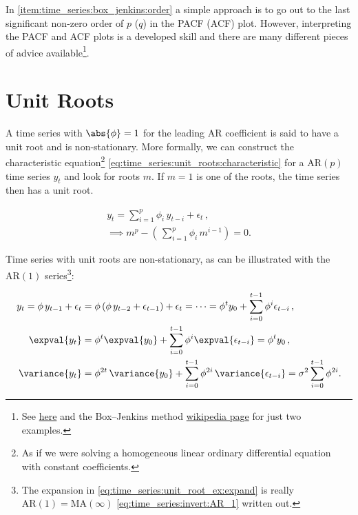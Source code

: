 In \cref{item:time_series:box_jenkins:order} a simple approach is to
go out to the last significant non-zero order of $p$ ($q$) in the PACF (ACF) plot.
However, interpreting the PACF and ACF plots is a developed skill
and there are many different pieces of advice
available\footnote{See
\href{https://people.duke.edu/~rnau/411arim3.htm}{here}
and the Box--Jenkins method
\href{https://en.wikipedia.org/wiki/Box\%E2\%80\%93Jenkins\_method\#Autocorrelation\_and\_partial\_autocorrelation\_plots}{wikipedia page}
for just two examples.}.

\section{Unit Roots}
\label{time_series:unit_root}

A time series with $\abs{\phi} = 1$ for the leading AR coefficient
is said to have a unit root and is non-stationary.
More formally, we can construct the characteristic
equation\footnote{As if we were solving a
homogeneous linear ordinary differential equation with constant coefficients.} \cref{eq:time_series:unit_roots:characteristic}
for a $\text{AR}\left(p\right)$ time series $y_{t}$ and look for roots $m$.
If $m=1$ is one of the roots, the time series then has a unit root.

\begin{subequations}\label{eq:time_series:unit_roots}
\begin{gather}
y_{t} = \sum_{i=1}^{p} \phi_{i}\, y_{t-i} + \epsilon_{t}\,, \label{eq:time_series:unit_roots:y} \\
\implies m^{p} - \left(\, \sum_{i=1}^{p} \phi_{i}\, m^{i-1} \right) = 0. \label{eq:time_series:unit_roots:characteristic}
\end{gather}
\end{subequations}

Time series with unit roots are non-stationary,
as can be illustrated with the $\text{AR}\left(1\right)$ series\footnote{The expansion
in \cref{eq:time_series:unit_root_ex:expand} is really
$\text{AR}\left(1\right) = \text{MA}\left(\infty\right)$ \cref{eq:time_series:invert:AR_1} written out.}:

\begin{subequations}\label{eq:time_series:unit_root_ex}
\begin{align}
y_{t}
= \phi\, y_{t-1} + \epsilon_{t}
&= \phi \left(\phi\, y_{t-2} + \epsilon_{t-1}\right) + \epsilon_{t}
= \cdots
= \phi^{t} y_{0} + \sum_{i=0}^{t-1} \phi^{i} \epsilon_{t-i}\,, \label{eq:time_series:unit_root_ex:expand} \\
\expval{y_{t}}
&= \phi^{t} \expval{y_{0}} + \sum_{i=0}^{t-1} \phi^{i} \expval{\epsilon_{t-i}}
= \phi^{t} y_{0}\,, \label{eq:time_series:unit_root_ex:expval} \\
\variance{y_{t}}
&= \phi^{2t}\, \variance{y_{0}} + \sum_{i=0}^{t-1} \phi^{2i}\, \variance{\epsilon_{t-i}}
= \sigma^{2} \sum_{i=0}^{t-1} \phi^{2i}. \label{eq:time_series:unit_root_ex:var}
\end{align}
\end{subequations}

